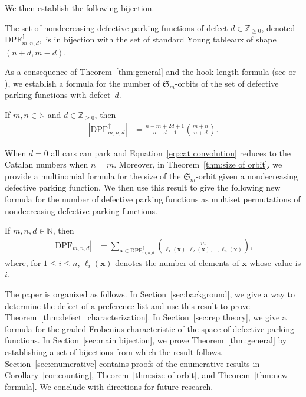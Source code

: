 \documentclass[11pt,reqno]{BICA}
\theoremstyle{definition}
\newcommand{\Sym}{\mathfrak{S}}
\newcommand{\NDDPF}{\mathrm{DPF}^\uparrow}
\newcommand{\DPF}{\mathrm{DPF}}
\newcommand{\x}{\mathbf{x}}
\newcommand{\NN}{\mathbb{N}}
\begin{document}
We then establish the following bijection.

\begin{theorem}\label{thm:general}
The set of nondecreasing defective parking functions of defect $d \in \mathbb{Z}_{\geq0}$, denoted $\DPF_{m,n,d}^{\uparrow},$ is in bijection with the set of standard Young tableaux of shape $(n+d,m-d)$.
\end{theorem}

As a consequence of Theorem~\ref{thm:general} and the hook length formula (see \cite{FRT} or \cite[Section 3.10]{Sagan}), we establish a formula for the number of $\mathfrak{S}_m$-orbits of the set of defective parking functions with defect~$d$.

\begin{corollary}\label{cor:counting}
If $m,n\in\mathbb{N}$ and $d \in \mathbb{Z}_{\geq0}$, then
    \begin{align}\label{eq:cat convolution}
    |\NDDPF_{m,n,d}| &= \frac{n-m+2d+1}{n+d+1}\binom{m+n}{n+d}.
    \end{align}
\end{corollary}
When $d=0$ all cars can park and Equation~\eqref{eq:cat convolution} reduces to the Catalan numbers when $n=m$. 
Moreover, in Theorem~\ref{thm:size of orbit}, we provide a multinomial formula for the size of the $\Sym_{m}$-orbit given a nondecreasing defective parking function. 
We then use this result to give the following  new formula for the number of defective parking functions as multiset permutations of nondecreasing defective parking functions. 
\begin{theorem}\label{thm:new formula}
If $m,n,d\in\NN$,
then
    \begin{align}\label{eq:full count}
    |\DPF_{m,n,d}| &= \sum_{\x \in \NDDPF_{m,n,d}}\binom{m}{\ell_1(\x),\ell_2(\x),\ldots,\ell_{n}(\x)},
    \end{align}
   where, for $1\leq i\leq n$, $\ell_i(\x)$ denotes the number of elements of $\x$ whose value is $i$.
\end{theorem}

The paper is organized as follows.
In Section~\ref{sec:background}, we give a way to determine the defect of a preference list and use this result to prove Theorem~\ref{thm:defect_characterization}.
In Section~\ref{sec:rep theory},
we give a formula for the graded Frobenius characteristic of the space of defective parking functions.
In Section~\ref{sec:main bijection}, we prove Theorem~\ref{thm:general}
by establishing a set of bijections from which the result follows.
Section~\ref{sec:enumerative} contains proofs of the enumerative results in Corollary~\ref{cor:counting}, Theorem~\ref{thm:size of orbit}, and Theorem~\ref{thm:new formula}. We conclude with directions for future research.
\end{document}
